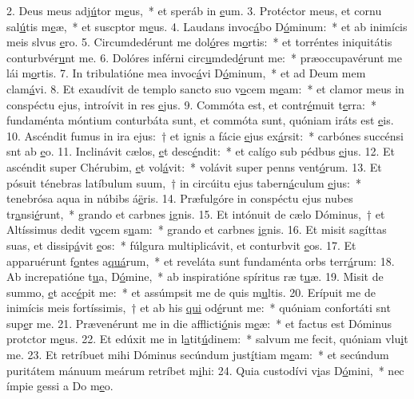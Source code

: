 2. Deus meus adj\uline{ú}tor m\uline{e}us,~* et speráb in \uline{e}um.
3. Protéctor meus, et cornu sal\uline{ú}tis m\uline{e}æ,~* et suscptor m\uline{e}us.
4. Laudans invoc\uline{á}bo D\uline{ó}minum:~* et ab inimícis meis slvus \uline{e}ro.
5. Circumdedérunt me dol\uline{ó}res m\uline{o}rtis:~* et torréntes iniquitátis conturbvér\uline{u}nt me.
6. Dolóres inférni circ\uline{u}mded\uline{é}runt me:~* præoccupavérunt me lái m\uline{o}rtis.
7. In tribulatióne mea invoc\uline{á}vi D\uline{ó}minum,~* et ad Deum mem clam\uline{á}vi.
8. Et exaudívit de templo sancto suo v\uline{o}cem m\uline{e}am:~* et clamor meus in conspéctu ejus, introívit in res \uline{e}jus.
9. Commóta est, et contr\uline{é}muit t\uline{e}rra:~* fundaménta móntium conturbáta sunt, et commóta sunt, quóniam iráts est \uline{e}is.
10. Ascéndit fumus in ira ejus:~† et ignis a fácie \uline{e}jus ex\uline{á}rsit:~* carbónes succénsi snt ab \uline{e}o.
11. Inclinávit cælos, \uline{e}t desc\uline{é}ndit:~* et calígo sub pédbus \uline{e}jus.
12. Et ascéndit super Chérubim, \uline{e}t vol\uline{á}vit:~* volávit super penns vent\uline{ó}rum.
13. Et pósuit ténebras latíbulum suum,~† in circúitu ejus tabern\uline{á}culum \uline{e}jus:~* tenebrósa aqua in núbibs á\uline{ë}ris.
14. Præfulgóre in conspéctu ejus nubes tr\uline{a}nsi\uline{é}runt,~* grando et carbnes \uline{i}gnis.
15. Et intónuit de cælo Dóminus,~† et Altíssimus dedit v\uline{o}cem s\uline{u}am:~* grando et carbnes \uline{i}gnis.
16. Et misit sagíttas suas, et dissip\uline{á}vit \uline{e}os:~* fúlgura multiplicávit, et conturbvit \uline{e}os.
17. Et apparuérunt f\uline{o}ntes a\uline{quá}rum,~* et reveláta sunt fundaménta orbs terr\uline{á}rum:
18. Ab increpatióne t\uline{u}a, D\uline{ó}mine,~* ab inspiratióne spíritus ræ t\uline{u}æ.
19. Misit de summo, \uline{e}t acc\uline{é}pit me:~* et assúmpsit me de quis m\uline{u}ltis.
20. Erípuit me de inimícis meis fortíssimis,~† et ab his \uline{qui} od\uline{é}runt me:~* quóniam confortáti snt sup\uline{e}r me.
21. Prævenérunt me in die afflicti\uline{ó}nis m\uline{e}æ:~* et factus est Dóminus protctor m\uline{e}us.
22. Et edúxit me in l\uline{a}tit\uline{ú}dinem:~* salvum me fecit, quóniam vlu\uline{i}t me.
23. Et retríbuet mihi Dóminus secúndum just\uline{í}tiam m\uline{e}am:~* et secúndum puritátem mánuum meárum retríbet m\uline{i}hi:
24. Quia custodívi v\uline{i}as D\uline{ó}mini,~* nec ímpie gessi a Do m\uline{e}o.
